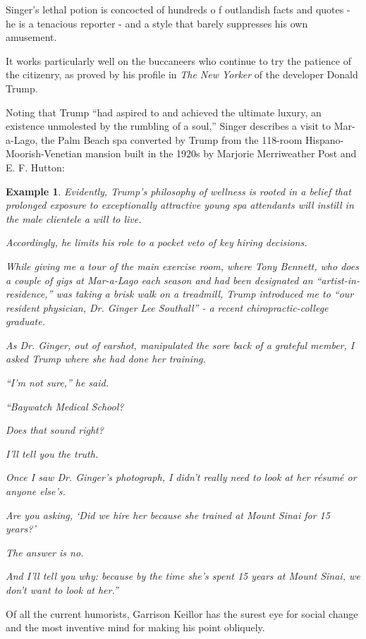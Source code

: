 \documentclass{book}
\numberwithin{equation}{section}
\newtheorem{example}{Example}[chapter]
\begin{document}
%
Singer's lethal potion is concocted of hundreds o f outlandish facts and quotes - he is a tenacious reporter - and a style that barely suppresses his own amusement.

It works particularly well on the buccaneers who continue to try the patience of the citizenry, as proved by his profile in \textit{The New Yorker} of the developer Donald Trump.

Noting that Trump ``had aspired to and achieved the ultimate luxury, an existence unmolested by the rumbling of a soul,'' Singer describes a visit to Mar-a-Lago, the Palm Beach spa converted by Trump from the 118-room Hispano-Moorish-Venetian mansion built in the 1920s by Marjorie Merriweather Post and E. F. Hutton:
\begin{example}
    Evidently, Trump's philosophy of wellness is rooted in a belief that prolonged exposure to exceptionally attractive young spa attendants will instill in the male clientele a will to live.
    
    Accordingly, he limits his role to a pocket veto of key hiring decisions.
    
    While giving me a tour of the main exercise room, where Tony Bennett, who does a couple of gigs at Mar-a-Lago each season and had been designated an ``artist-in-residence,'' was taking a brisk walk on a treadmill, Trump introduced me to ``our resident physician, Dr. Ginger Lee Southall'' - a recent chiropractic-college graduate.
    
    As Dr. Ginger, out of earshot, manipulated the sore back of a grateful member, I asked Trump where she had done her training.
    
    ``I'm not sure,'' he said.
    
    ``Baywatch Medical School?
    
    Does that sound right?
    
    I'll tell you the truth.
    
    Once I saw Dr. Ginger's photograph, I didn't really need to look at her r\'esum\'e or anyone else's.
    
    Are you asking, `Did we hire her because she trained at Mount Sinai for 15 years?'
    
    The answer is no.
    
    And I'll tell you why: because by the time she's spent 15 years at Mount Sinai, we don't want to look at her.''
\end{example}
Of all the current humorists, Garrison Keillor has the surest eye for social change and the most inventive mind for making his point obliquely.
\end{document}
